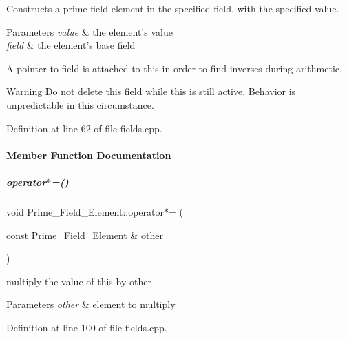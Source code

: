 Constructs a prime field element in the specified field, with the specified value. 


\begin{DoxyParams}{Parameters}
{\em value} & the element's value \\
\hline
{\em field} & the element's base field\\
\hline
\end{DoxyParams}
A pointer to {\ttfamily field} is attached to {\ttfamily this} in order to find inverses during arithmetic. \begin{DoxyWarning}{Warning}
Do not delete this field while {\ttfamily this} is still active. Behavior is unpredictable in this circumstance. 
\end{DoxyWarning}


Definition at line 62 of file fields.\+cpp.



\paragraph{Member Function Documentation}
\mbox{\label{group___fields_group_a1ef7c74bd84a82b7c346dd7fa4e4a480}} 
\subparagraph{\texorpdfstring{operator$\ast$=()}{operator*=()}\hspace{0.1cm}{\footnotesize\ttfamily [1/2]}}
{\footnotesize\ttfamily void Prime\+\_\+\+Field\+\_\+\+Element\+::operator$\ast$= (\begin{DoxyParamCaption}\item[{const \hyperlink{group___fields_group_class_prime___field___element}{Prime\+\_\+\+Field\+\_\+\+Element} \&}]{other }\end{DoxyParamCaption})}



multiply the value of {\ttfamily this} by {\ttfamily other} 


\begin{DoxyParams}{Parameters}
{\em other} & element to multiply \\
\hline
\end{DoxyParams}


Definition at line 100 of file fields.\+cpp.

